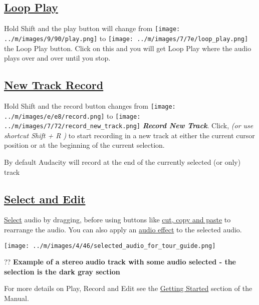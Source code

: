 \documentclass[]{book}
\begin{document}
\begin{multicols}{2}
\subsection{
\hyperref[playing_and_recording__transport]{Loop Play}
}


Hold Shift and the play button will change from \texttt{[image: ../m/images/9/90/play.png]} to \texttt{[image: ../m/images/7/7e/loop\_play.png]} the Loop Play button. Click on this and you will get Loop Play where the audio plays over and over until you stop.  

\subsection{
\hyperref[recording__newtrack]{New Track Record}
}


Hold Shift and the record button changes from \texttt{[image: ../m/images/e/e8/record.png]} to \texttt{[image: ../m/images/7/72/record\_new\_track.png]} \textit{\textbf{Record New Track}}.  Click, \textit{(or use shortcut Shift + R )} to start recording in a new track at either the current cursor position or at the beginning of the current selection.

By default Audacity will record at the end of the currently selected (or only) track

\subsection{
\hyperref[selecting_audio_the_basics_]{Select and Edit}
}



\hyperref[selecting_audio_the_basics_]{Select}
 audio by dragging, before using buttons like 
\hyperref[edit_toolbar_]{cut, copy and paste}
 to rearrange the audio.  You can also apply an 
\hyperref[effect_menu_audacity_]{audio effect}
 to the selected audio.\par\texttt{[image: ../m/images/4/46/selected\_audio\_for\_tour\_guide.png]}\par??
\textbf{Example of a stereo audio track with some audio selected - the selection is the dark gray section}

For more details on Play, Record and Edit see the 
\hyperref[quick_help_]{Getting Started}
 section of the Manual.





\end{multicols}
\end{document}
